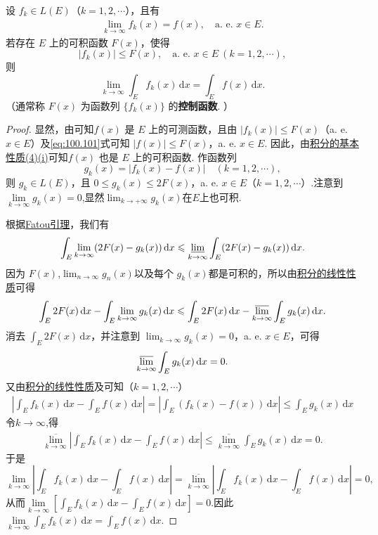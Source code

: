 \documentclass[../../main.tex]{subfiles}
\begin{document}
\begin{theorem}[控制收敛定理]\label{theorem:控制收敛定理}
设 $f_k \in L(E)$（$k = 1, 2, \cdots$），且有
\begin{align}\label{eq:100.101}
\lim_{k \to \infty} f_k(x) = f(x), \quad \text{a. e. } x \in E.
\end{align}
若存在 $E$ 上的可积函数 $F(x)$，使得
\[
|f_k(x)| \leqslant F(x), \quad \text{a. e. } x \in E \ (k = 1, 2, \cdots),
\]
则
\[
\lim_{k \to \infty} \int_E f_k(x) \, \mathrm{d}x = \int_E f(x) \, \mathrm{d}x. 
\]
（通常称 $F(x)$ 为函数列 $\{ f_k(x) \}$ 的\textbf{控制函数}. ）
\end{theorem}
\begin{proof}
显然，由可知$f(x)$ 是 $E$ 上的可测函数，且由 $|f_k(x)| \leqslant F(x)$（a. e. $x \in E$）及\eqref{eq:100.101}式可知 $|f(x)| \leqslant F(x)$，a. e. $x \in E$. 因此，由\hyperref[theorem:积分的基本性质]{积分的基本性质(4)(i)}可知$f(x)$ 也是 $E$ 上的可积函数. 作函数列
\[
g_k(x) = |f_k(x) - f(x)| \quad (k = 1, 2, \cdots),
\]
则 $g_k \in L(E)$，且 $0 \leqslant g_k(x) \leqslant 2F(x)$，a. e. $x \in E$（$k = 1, 2, \cdots$）.注意到$\underset{k\rightarrow \infty}{\lim}g_k\left( x \right) =0$,显然$\lim_{k\to +\infty}g_k(x)$在$E$上也可积.

根据\hyperref[lemma:Fatou引理]{Fatou引理}，我们有
\[
\int_E \lim_{k \to \infty} (2F(x) - g_k(x)) \, \mathrm{d}x \leqslant \varliminf_{k \to \infty} \int_E (2F(x) - g_k(x)) \, \mathrm{d}x.
\]
因为 $F(x)$,$\lim_{n\to \infty}g_n(x)$以及每个 $g_k(x)$都是可积的，所以由\hyperref[theorem:积分的线性性质]{积分的线性性质}可得
\[
\int_E 2F(x) \, \mathrm{d}x - \int_E \lim_{k \to \infty} g_k(x) \, \mathrm{d}x \leqslant \int_E 2F(x) \, \mathrm{d}x - \varlimsup_{k \to \infty} \int_E g_k(x) \, \mathrm{d}x.
\]
消去 $\int_E 2F(x) \, \mathrm{d}x$，并注意到 $\lim_{k \to \infty} g_k(x) = 0$，a. e. $x \in E$，可得
\[
\varlimsup_{k \to \infty} \int_E g_k(x) \, \mathrm{d}x = 0.
\]
又由\hyperref[theorem:积分的线性性质]{积分的线性性质}及可知（$k = 1, 2, \cdots$）
\begin{align*}
\left| \int_E f_k(x) \, \mathrm{d}x - \int_E f(x) \, \mathrm{d}x \right| = \left| \int_E (f_k(x) - f(x)) \, \mathrm{d}x \right| 
\leqslant \int_E g_k(x) \, \mathrm{d}x
\end{align*}
令$k\to \infty$,得
\begin{align*}
\underset{k\rightarrow \infty}{\overline{\lim }}\left| \int_E{f_k(x)\,\mathrm{d}x}-\int_E{f(x)\,\mathrm{d}x} \right|\leqslant \underset{k\rightarrow \infty}{\overline{\lim }}\int_E{g_k(x)\,\mathrm{d}x}=0.
\end{align*}
于是$$\underset{k\rightarrow \infty}{\lim}\left| \int_E{f_k(x)\,\mathrm{d}x}-\int_E{f(x)\,\mathrm{d}x} \right|=\underset{k\rightarrow \infty}{\overline{\lim }}\left| \int_E{f_k(x)\,\mathrm{d}x}-\int_E{f(x)\,\mathrm{d}x} \right|=0,$$
从而$\underset{k\rightarrow \infty}{\lim}\left[ \int_E{f_k(x)\,\mathrm{d}x}-\int_E{f(x)\,\mathrm{d}x} \right] =0$.因此$\underset{k\rightarrow \infty}{\lim}\int_E{f_k(x)\,\mathrm{d}x}=\int_E{f(x)\,\mathrm{d}x}.$
\end{proof}
\end{document}
